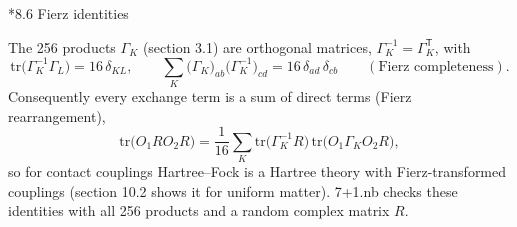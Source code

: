 \documentclass[10pt,a4paper]{article}
\makeatletter
\renewcommand\subsection{\@startsection{subsection}{2}{\z@}{-3.25ex\@plus -1ex \@minus -.2ex}{1.5ex \@plus .2ex}{\normalfont\large\bfseries\raggedright}}
\makeatother
\begin{document}
\subsection*{8.6 Fierz identities}
The 256 products $\Gamma_K$ (section 3.1) are orthogonal matrices, $\Gamma_K^{-1}=\Gamma_K^{\mathsf T}$, with
\begin{equation*}
\mathrm{tr}\big(\Gamma_K^{-1}\Gamma_L\big)=16\,\delta_{KL},\qquad \sum_K\big(\Gamma_K\big)_{ab}\big(\Gamma_K^{-1}\big)_{cd}=16\,\delta_{ad}\,\delta_{cb}\qquad(\text{Fierz completeness}).
\end{equation*}
Consequently every exchange term is a sum of direct terms (Fierz rearrangement),
\begin{equation*}
\mathrm{tr}\big(O_1RO_2R\big)=\frac1{16}\sum_K\mathrm{tr}\big(\Gamma_K^{-1}R\big)\,\mathrm{tr}\big(O_1\Gamma_KO_2R\big),
\end{equation*}
so for contact couplings Hartree–Fock is a Hartree theory with Fierz-transformed couplings (section 10.2 shows it for uniform matter). 7+1.nb checks these identities with all 256 products and a random complex matrix $R$.
\end{document}
